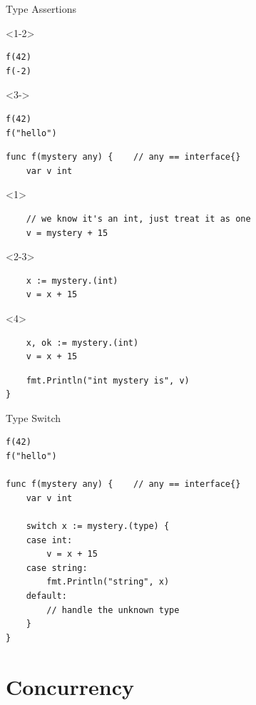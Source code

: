 \documentclass[pdf]{beamer}
\begin{document}
\begin{frame}[fragile]{Type Assertions}
\begin{onlyenv}<1-2>
\begin{lstlisting}
f(42)
f(-2)
\end{lstlisting}
\end{onlyenv}
\begin{onlyenv}<3->
\begin{lstlisting}
f(42)
f("hello")
\end{lstlisting}
\end{onlyenv}
\begin{lstlisting}
func f(mystery any) {    // any == interface{}
    var v int
\end{lstlisting}
\begin{onlyenv}<1>
\begin{lstlisting}
    // we know it's an int, just treat it as one
    v = mystery + 15
\end{lstlisting}
\end{onlyenv}
\begin{onlyenv}<2-3>
\begin{lstlisting}
    x := mystery.(int)
    v = x + 15
\end{lstlisting}
\end{onlyenv}
\begin{onlyenv}<4>
\begin{lstlisting}
    x, ok := mystery.(int)
    v = x + 15
\end{lstlisting}
\end{onlyenv}
\begin{lstlisting}
    fmt.Println("int mystery is", v)
}
\end{lstlisting}
\end{frame}

\begin{frame}[fragile]{Type Switch}
\begin{lstlisting}
f(42)
f("hello")

func f(mystery any) {    // any == interface{}
    var v int
    
    switch x := mystery.(type) {
    case int:
        v = x + 15
    case string:
        fmt.Println("string", x)
    default:
        // handle the unknown type
    }
}
\end{lstlisting}
\end{frame}

\section[Concurrency]{Concurrency}
\begin{lstlisting}
\end{lstlisting}
\end{document}
